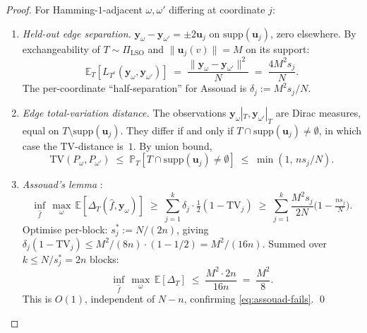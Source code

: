 \documentclass[11pt,a4paper]{article}
\theoremstyle{plain}
\theoremstyle{definition}
\theoremstyle{remark}
\newcommand{\by}{\mathbf{y}}
\newcommand{\bu}{\mathbf{u}}
\newcommand{\E}{\mathbb{E}}
\newcommand{\PR}{\mathbb{P}}
\newcommand{\TV}{\mathrm{TV}}
\begin{document}
\begin{proof}
For Hamming-$1$-adjacent $\omega, \omega'$ differing at coordinate
$j$:
\begin{enumerate}[label=(\roman*),leftmargin=*]
\item \emph{Held-out edge separation.} $\by_\omega - \by_{\omega'} = \pm 2\bu_j$
    on $\mathrm{supp}(\bu_j)$, zero elsewhere. By exchangeability of
    $T \sim \Pi_{\mathrm{LSO}}$ and $\|\bu_j(v)\| = M$ on its support:
\begin{equation*}
    \E_T[L_{T^c}(\by_\omega, \by_{\omega'})]
    \;=\; \frac{\|\by_\omega - \by_{\omega'}\|^2}{N}
    \;=\; \frac{4 M^2 s_j}{N}.
\end{equation*}
    The per-coordinate ``half-separation'' for Assouad is
    $\delta_j := M^2 s_j/N$.

\item \emph{Edge total-variation distance.} The observations
    $\by_\omega|_T, \by_{\omega'}|_T$ are Dirac measures, equal
    on $T \setminus \mathrm{supp}(\bu_j)$. They differ if and only
    if $T \cap \mathrm{supp}(\bu_j) \neq \emptyset$, in which case
    the TV-distance is~$1$. By union bound,
\begin{equation*}
    \TV(P_\omega, P_{\omega'}) \;\le\; \PR_T[T \cap \mathrm{supp}(\bu_j) \neq \emptyset]
    \;\le\; \min(1,\, n s_j/N).
\end{equation*}

\item \emph{Assouad's lemma} \citep[][Lemma~2]{Yu1997assouad}:
\begin{equation*}
    \inf_{\hat f}\, \max_\omega\, \E[\Delta_T(\hat f, \by_\omega)]
    \;\ge\; \sum_{j=1}^k \delta_j \cdot \tfrac{1}{2}(1 - \TV_j)
    \;\ge\; \sum_{j=1}^k \frac{M^2 s_j}{2N}\big(1 - \tfrac{n s_j}{N}\big).
\end{equation*}
    Optimise per-block: $s_j^* := N/(2n)$, giving
    $\delta_j(1 - \TV_j) \le M^2/(8n) \cdot (1 - 1/2) = M^2/(16n)$.
    Summed over $k \le N/s_j^* = 2n$ blocks:
\begin{equation*}
    \inf_{\hat f}\, \max_\omega\, \E[\Delta_T] \;\le\; \frac{M^2 \cdot 2n}{16n} \;=\; \frac{M^2}{8}.
\end{equation*}
    This is $O(1)$, independent of $N - n$, confirming
    \eqref{eq:assouad-fails}. \qed
\end{enumerate}
\end{proof}
\end{document}
